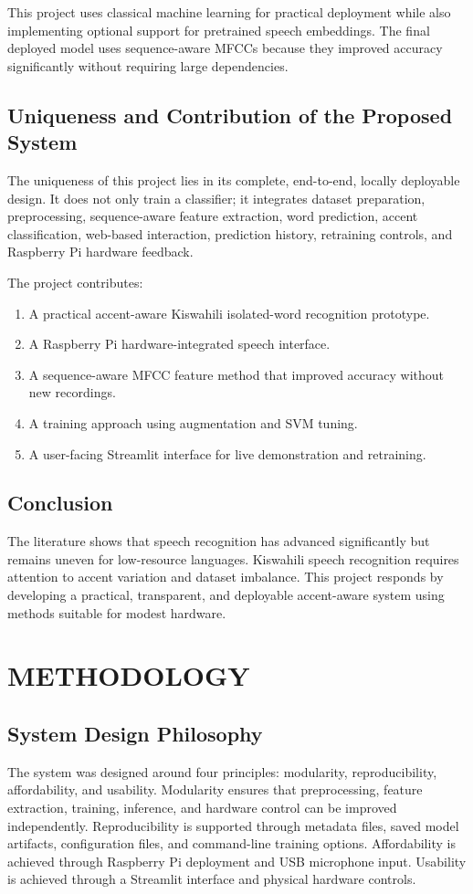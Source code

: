 \documentclass[12pt,a4paper]{report}
\begin{document}
This project uses classical machine learning for practical deployment while also implementing optional support for pretrained speech embeddings. The final deployed model uses sequence-aware MFCCs because they improved accuracy significantly without requiring large dependencies.

\section{Uniqueness and Contribution of the Proposed System}
The uniqueness of this project lies in its complete, end-to-end, locally deployable design. It does not only train a classifier; it integrates dataset preparation, preprocessing, sequence-aware feature extraction, word prediction, accent classification, web-based interaction, prediction history, retraining controls, and Raspberry Pi hardware feedback.

The project contributes:
\begin{enumerate}[label=\alph*)]
    \item A practical accent-aware Kiswahili isolated-word recognition prototype.
    \item A Raspberry Pi hardware-integrated speech interface.
    \item A sequence-aware MFCC feature method that improved accuracy without new recordings.
    \item A training approach using augmentation and SVM tuning.
    \item A user-facing Streamlit interface for live demonstration and retraining.
\end{enumerate}

\section{Conclusion}
The literature shows that speech recognition has advanced significantly but remains uneven for low-resource languages. Kiswahili speech recognition requires attention to accent variation and dataset imbalance. This project responds by developing a practical, transparent, and deployable accent-aware system using methods suitable for modest hardware.

\chapter{METHODOLOGY}

\section{System Design Philosophy}
The system was designed around four principles: modularity, reproducibility, affordability, and usability. Modularity ensures that preprocessing, feature extraction, training, inference, and hardware control can be improved independently. Reproducibility is supported through metadata files, saved model artifacts, configuration files, and command-line training options. Affordability is achieved through Raspberry Pi deployment and USB microphone input. Usability is achieved through a Streamlit interface and physical hardware controls.
\end{document}
